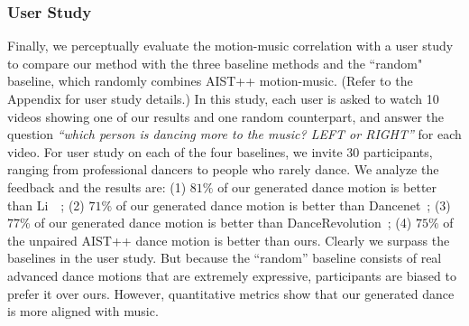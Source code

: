 \vspace{-3mm}
\subsubsection{User Study}
\label{sec:user_study}
Finally, we perceptually evaluate the motion-music correlation with a user study to compare our method with the three baseline methods and the ``random" baseline, which randomly combines AIST++ motion-music. (Refer to the Appendix for user study details.)
In this study, each user is asked to watch 10 videos showing one of our results and one random counterpart, and answer the question \emph{``which person is dancing more to the music? LEFT or RIGHT''} for each video. 
For user study on each of the four baselines, we invite 30 participants, ranging from professional dancers to people who rarely dance. 
We analyze the feedback and the results are: (1) $81\%$ of our generated dance motion is better than Li~\etal~\cite{li2020learning}; (2) $71\%$ of our generated dance motion is better than Dancenet~\cite{zhuang2020music2dance}; {(3) $77\%$ of our generated dance motion is better than DanceRevolution~\cite{huang2021}; }(4) $75\%$ of the unpaired AIST++ dance motion is better than ours. 
Clearly we surpass the baselines in the user study. 
But because the ``random'' baseline consists of real advanced dance motions that are extremely expressive, participants are biased to prefer it over ours. 
However, quantitative metrics show that our generated dance is more aligned with music.

\begin{table}[t]
\vspace{-5mm}
\midsepdefault
\caption{{\textbf{Ablation Study on Cross-modal Fusion.} Early fusion of the two modalities allows the model to generate motion sequences align better with the conditioning music. *Note this number is calculated using the music paired with the input motion.}}
\label{tab:exp_crossmodal}
\vspace{-2mm}
\end{table} 